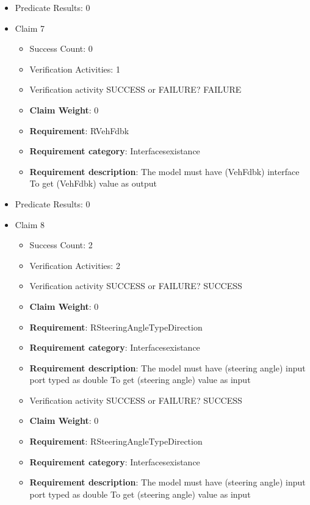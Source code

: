 \documentclass{article}
\begin{document}
\begin{itemize}
\begin{itemize}
				\end{itemize}
				
									    
				\item Predicate Results: 0

  				  \item Claim 7
				\begin{itemize}
			    	\item Success Count: 0 
			    	\item Verification Activities: 1
					\item Verification activity SUCCESS or FAILURE? FAILURE
					\item \textbf{Claim Weight}: 0
						\item \textbf{Requirement}: RVehFdbk 
						\item \textbf{Requirement category}: Interfacesexistance 
						\item \textbf{Requirement description}: The model must have (VehFdbk) interface To get (VehFdbk) value as output
					
				\end{itemize}
				
									    
				\item Predicate Results: 0

  				  \item Claim 8
				\begin{itemize}
			    	\item Success Count: 2 
			    	\item Verification Activities: 2
					\item Verification activity SUCCESS or FAILURE? SUCCESS
					\item \textbf{Claim Weight}: 0
						\item \textbf{Requirement}: RSteeringAngleTypeDirection 
						\item \textbf{Requirement category}: Interfacesexistance 
						\item \textbf{Requirement description}: The model must have (steering angle) input port typed as double To get (steering angle) value as input
					
					\item Verification activity SUCCESS or FAILURE? SUCCESS
					\item \textbf{Claim Weight}: 0
						\item \textbf{Requirement}: RSteeringAngleTypeDirection 
						\item \textbf{Requirement category}: Interfacesexistance 
						\item \textbf{Requirement description}: The model must have (steering angle) input port typed as double To get (steering angle) value as input
					

\end{itemize}
\end{itemize}
\end{document}
